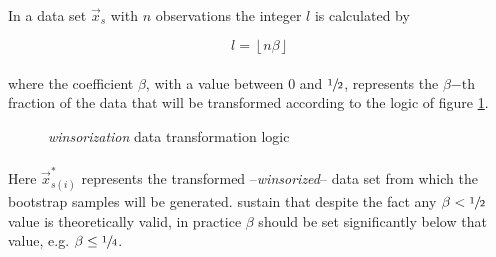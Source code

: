 \documentclass[letterpaper]{article}
\begin{document}
\paragraph{}
In a data set $\vec{x}_s$ with $n$ observations the integer $l$ is calculated by

\begin{equation}
    l=\left\lfloor{n\beta}\right\rfloor
\end{equation} 


\paragraph{}
where the coefficient $\beta$, with a value between 0 and $\sfrac{1}{2}$, represents the $\beta\mathrm{-th}$ fraction of the data that will be transformed according to the logic of figure \ref{fig:data_transf}.\linebreak

\begin{figure}[h!]
    \begin{center}
\caption{\textit{winsorization} data transformation logic\linebreak\cite{singh1998breakdown}}
\label{fig:data_transf}
    \end{center}
\end{figure}

\paragraph{}
Here $\vec{x}^*_{s(i)}$ represents the transformed --\textit{winsorized}-- data set from which the bootstrap samples will be generated. \cite{singh1998breakdown} sustain that despite the fact any $\beta<\sfrac{1}{2}$ value is theoretically valid, in practice $\beta$ should be set significantly below that value, e.g. $\beta\le\sfrac{1}{4}$.
\end{document}
